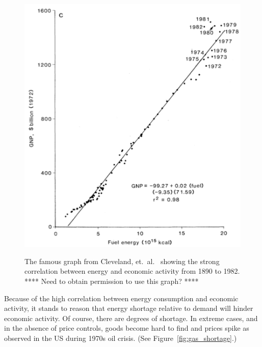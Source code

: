 \begin{figure}[!ht]
\centering\
\includegraphics[width=\linewidth]{Part_0/Chapter_Introduction/images/Cleveland1984.pdf}
\caption[Energy and economic activity]{The famous graph from Cleveland, et.\ al.\
\cite{Cleveland:1984aa} showing the strong correlation 
between energy and economic activity from 1890 to 1982.
**** Need to obtain permission to use this graph? ****}
\label{fig:Cleveland1984}
\end{figure}

Because of the high correlation between energy consumption and economic activity,
it stands to reason that energy shortage relative to demand will hinder economic activity.
Of course, there are degrees of shortage. 
In extreme cases, and in the absence of price controls,
goods become hard to find and prices spike
as observed in the US during 1970s oil crisis.
(See Figure~\ref{fig:gas_shortage}.)

